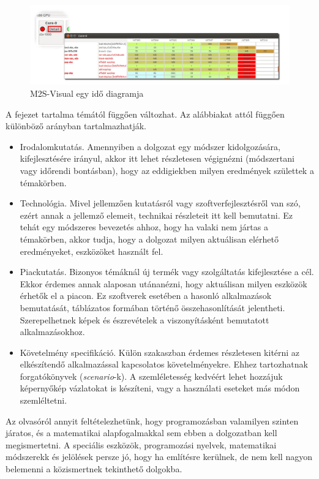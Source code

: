\begin{figure}[h]
\centering
\includegraphics[scale=0.5]{images/m2sv2.jpg}
\caption{M2S-Visual egy idő diagramja}
\label{fig:m2sv}
\end{figure}


A fejezet tartalma témától függően változhat. Az alábbiakat attól függően különböző arányban tartalmazhatják.
\begin{itemize}
\item Irodalomkutatás. Amennyiben a dolgozat egy módszer kidolgozására, kifejlesztésére irányul, akkor itt lehet részletesen végignézni (módszertani vagy időrendi bontásban), hogy az eddigiekben milyen eredmények születtek a témakörben.
\item Technológia. Mivel jellemzően kutatásról vagy szoftverfejlesztésről van szó, ezért annak a jellemző elemeit, technikai részleteit itt kell bemutatni.
Ez tehát egy módszeres bevezetés ahhoz, hogy ha valaki nem jártas a témakörben, akkor tudja, hogy a dolgozat milyen aktuálisan elérhető eredményeket, eszközöket használt fel.
\item Piackutatás. Bizonyos témáknál új termék vagy szolgáltatás kifejlesztése a cél.
Ekkor érdemes annak alaposan utánanézni, hogy aktuálisan milyen eszközök érhetők el a piacon.
Ez szoftverek esetében a hasonló alkalmazások bemutatását, táblázatos formában történő összehasonlítását jelentheti.
Szerepelhetnek képek és észrevételek a viszonyításként bemutatott alkalmazásokhoz.
\item Követelmény specifikáció. Külön szakaszban érdemes részletesen kitérni az elkészítendő alkalmazással kapcsolatos követelményekre.
Ehhez tartozhatnak forgatókönyvek (\textit{scenario}-k).
A szemléletesség kedvéért lehet hozzájuk képernyőkép vázlatokat is készíteni, vagy a használati eseteket más módon szemléltetni.
\end{itemize}


Az olvasóról annyit feltételezhetünk, hogy programozásban valamilyen szinten járatos, és a matematikai alapfogalmakkal sem ebben a dolgozatban kell megismertetni.
A speciális eszközök, programozási nyelvek, matematikai módszerekk és jelölések persze jó, hogy ha említésre kerülnek, de nem kell nagyon belemenni a közismertnek tekinthető dolgokba.
